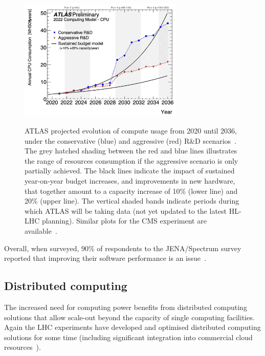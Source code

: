 \begin{figure}[htbp]
\begin{center}
\includegraphics[width=0.7\textwidth]{figures/Figure4} \\ 
\caption{ATLAS projected evolution of compute usage from 2020 until 2036, under the conservative (blue) and aggressive (red) R\&D scenarios~\cite{CERN-LHCC-2022-005}. The grey hatched shading between the red and blue lines illustrates the range of resources consumption if the aggressive scenario is only partially achieved. The black lines indicate the impact of sustained year-on-year budget increases, and improvements in new hardware, that together amount to a capacity increase of 10\% (lower line) and 20\% (upper line). The vertical shaded bands indicate periods during which ATLAS will be taking data  (not yet updated to the latest HL-LHC planning). Similar plots for the CMS experiment are available~\cite{Software:2815292}. }
\label{figures:Fig4}
\end{center}
\end{figure}


Overall, when surveyed, 90\% of respondents to the JENA/Spectrum survey reported that improving their software performance is an issue~\cite{JENA-Spectrum-Survey-Report}.



\subsection{Distributed computing}


The increased need for computing power benefits from distributed computing solutions that allow scale-out beyond the capacity of single computing facilities. Again the LHC experiments have developed and optimised distributed computing solutions for some time (including significant integration into commercial cloud resources~\cite{Megino_2024}).

